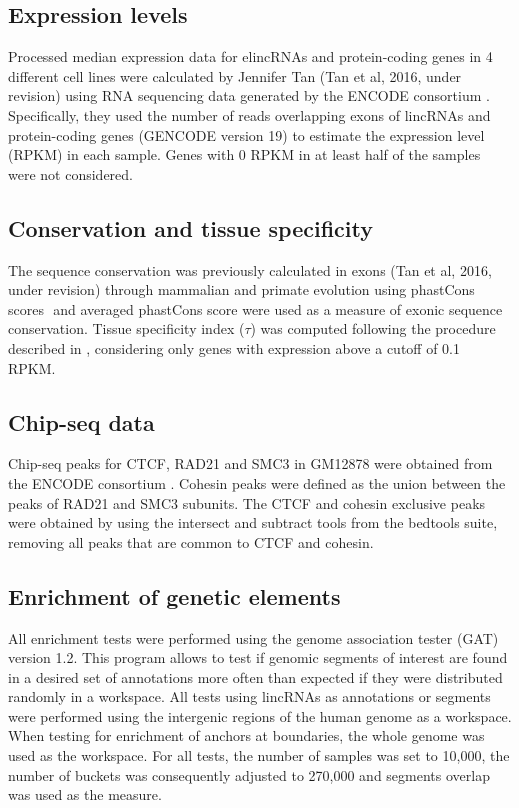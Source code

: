 \documentclass[11pt,a4paper]{report}
\begin{document}
\subsection*{Expression levels}

Processed median expression data for elincRNAs and protein-coding genes in 4  different cell lines were calculated by Jennifer Tan (Tan et al, 2016, under revision) using RNA sequencing data generated by the ENCODE consortium \cite{ENCODEProject2012}. Specifically, they used the number of reads overlapping exons of lincRNAs and protein-coding genes (GENCODE version 19) to estimate the expression level (RPKM) in each sample. Genes with 0 RPKM in at least half  of the samples were not considered.

\subsection*{Conservation and tissue specificity}

The sequence conservation was previously calculated in exons (Tan et al, 2016, under revision) through mammalian and primate evolution using phastCons scores \cite{Siepel2005}⁠ and averaged phastCons score were used as a measure of exonic sequence conservation. Tissue specificity index ($\tau$) was computed following the procedure described in \cite{Kryuchkova2015a}, considering only genes with expression above a cutoff of 0.1 RPKM.

\subsection*{Chip-seq data}

Chip-seq peaks for CTCF, RAD21 and SMC3 in GM12878 were obtained from the ENCODE consortium \cite{ENCODEProject2012}⁠. Cohesin peaks were defined as the union between the peaks of RAD21 and SMC3 subunits. The CTCF and cohesin exclusive peaks were obtained by using the intersect and subtract tools from the bedtools suite, removing all peaks that are common to CTCF and cohesin.

\subsection*{Enrichment of genetic elements}

All enrichment tests were performed using the genome association tester (GAT) \cite{Heger2013}⁠ version 1.2. This program allows to test if genomic segments of interest are found in a desired set of annotations more often than expected if they were distributed randomly in a workspace. All tests using lincRNAs as annotations or segments were performed using the intergenic regions of the human genome as a workspace. When testing for enrichment of anchors at boundaries, the whole genome was used as the workspace. For all tests, the number of samples was set to 10,000, the number of buckets was consequently adjusted to 270,000 and segments overlap was used as the measure.
\end{document}
